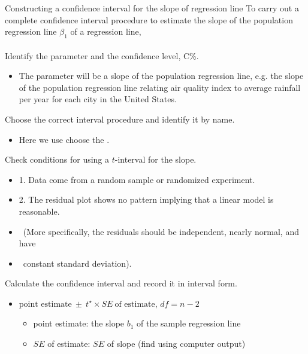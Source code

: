 \begin{onebox}{Constructing a confidence interval for the slope of regression line}
To carry out a complete confidence interval procedure to estimate the slope of the population regression line $\beta_1$ of a regression line,
\\
\\
 Identify the parameter and the confidence level, C\%.\vspace{-1mm}
\begin{itemize} 
\item[] The parameter will be a slope of the population regression line, e.g. the slope of the population regression line relating air quality index to average rainfall per year for each city in the United States.  
\end{itemize}
 Choose the correct interval procedure and identify it by name. \vspace{-1mm}
\begin{itemize}
\item[] Here we use choose the .
\end{itemize}
 Check conditions for using a $t$-interval for the slope.\vspace{-1mm}
\begin{itemize}
\setlength{\itemsep}{0mm}
\item[] 1.  Data come from a random sample or randomized experiment.
\item[] 2.  The residual plot shows no pattern implying that a linear model is reasonable. \item[] \quad \ (More specifically, the residuals should be independent, nearly normal, and have
\item [] \quad \  constant standard deviation).
\end{itemize}
 Calculate the confidence interval and record it in interval form.
\begin{itemize}
\item[] $\text{point estimate}\ \pm\ t^{\star} \times SE\ \text{of estimate}$, \quad $df = n - 2$
\begin{itemize}											
\item[] point estimate: the slope $b_1$ of the sample regression line
\item[] $SE$ of estimate: $SE$ of slope (find using computer output)

\end{itemize}
\end{itemize}
\end{onebox}
